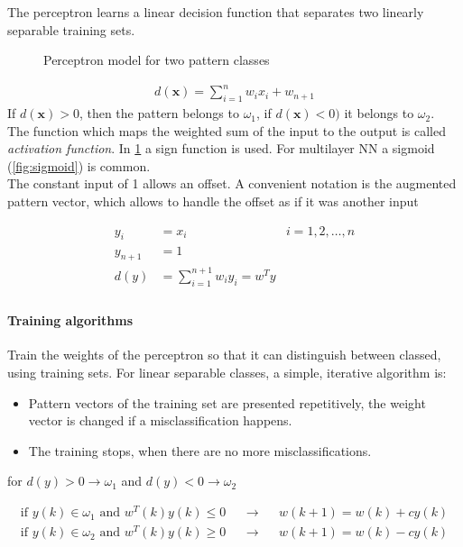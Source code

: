 The perceptron learns a linear decision function that separates two linearly separable training sets.

\begin{figure}[htb]
\centering
{}
\caption{Perceptron model for two pattern classes}
\label{fig:perceptron}
\end{figure}
\begin{align*}
d(\mathbf{x}) = \sum_{i=1}^nw_ix_i + w_{n+1}
\end{align*}
If $d(\mathbf{x}) > 0$, then the pattern belongs to $\omega_1$, if  $d(\mathbf{x}) < 0)$ it belongs to $\omega_2$. \\

The function which maps the weighted sum of the input to the output is called \emph{activation function}.
In \ref{fig:perceptron} a sign function is used.
For multilayer NN a sigmoid (\ref{fig:sigmoid}) is common. \\

The constant input of 1 allows an offset.
A convenient notation is the augmented pattern vector, which allows to handle the offset as if it was another input

\begin{align*}
y_i &= x_i & i=1,2,\dots,n \\
y_{n+1} &= 1 \\
d(y) &= \sum_{i=1}^{n+1}w_iy_i = w^Ty \\
\end{align*}

\paragraph{Training algorithms}
Train the weights of the perceptron so that it can distinguish between classed, using training sets.
For linear separable classes, a simple, iterative algorithm is:
\begin{itemize}
\item
Pattern vectors of the training set are presented repetitively, the weight vector is changed if a misclassification happens.
\item The training stops, when there are no more misclassifications.
\end{itemize}

for $d(y)>0 \rightarrow \omega_1$ and $d(y)<0 \rightarrow \omega_2$

\begin{align*}
\text{if } y(k) \in \omega_1 \text{ and } w^T(k)y(k) \leq 0 && \rightarrow && w(k+1) = w(k) +cy(k) \\
\text{if } y(k) \in \omega_2 \text{ and } w^T(k)y(k) \geq 0 && \rightarrow && w(k+1) = w(k)-cy(k)
\end{align*}


